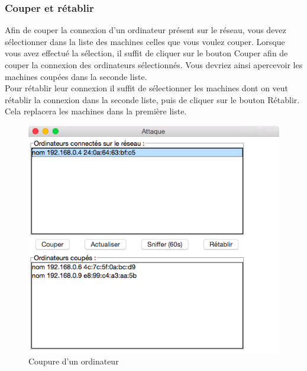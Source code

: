 \documentclass[11pt]{article}
\begin{document}
\subsubsection{Couper et rétablir}
Afin de couper la connexion d'un ordinateur présent sur le réseau, vous devez sélectionner dans la liste des machines celles que vous voulez couper. Lorsque vous avez effectué la sélection, il suffit de cliquer sur le bouton Couper afin de couper la connexion des ordinateurs sélectionnés. Vous devriez ainsi apercevoir les machines coupées dans la seconde liste.~\\
Pour rétablir leur connexion il suffit de sélectionner les machines dont on veut rétablir la connexion dans la seconde liste, puis de cliquer sur le bouton Rétablir. Cela replacera les machines dans la première liste.
\begin{figure}[!h]
\centering
\includegraphics[scale=0.5]{./Captures/couperFen.png}
\caption{Coupure d'un ordinateur}
\end{figure}
\newpage
\end{document}
